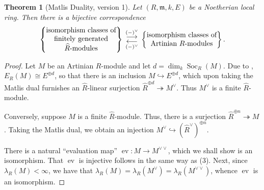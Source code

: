 \documentclass[10pt]{article}
\theoremstyle{thmstyle}
\newtheorem{theorem}{Theorem}[section]
\theoremstyle{defstyle}
\newcommand{\frakm}{\mathfrak{m}} %
\newcommand{\wh}[1]{\widehat{#1}}
\newcommand{\onto}{\twoheadrightarrow}
\newcommand{\into}{\hookrightarrow}
\newcommand{\ev}{\operatorname{ev}}
\newcommand{\Soc}{\operatorname{Soc}}
\begin{document}
\begin{theorem}[Matlis Duality, version 1]
    Let $(R,\frakm,k,E)$ be a Noetherian local ring. Then there is a bijective correspondence 
    \begin{equation*}
        \left\{
        \begin{tabular}{@{} c @{}}
            isomorphism classes of\\
            finitely generated\\ 
            $\wh R$-modules
        \end{tabular}
        \right\}
        \;
        \begin{gathered}
            \overset{(-)^\vee}{\longrightarrow}\\[-2ex]
            \underset{(-)^\vee}{\longleftarrow}
        \end{gathered}
        \;
        \left\{
        \begin{tabular}{@{} c @{}}
            isomorphism classes of\\
            Artinian $R$-modules
        \end{tabular}
        \right\}.
    \end{equation*}
\end{theorem}
\begin{proof} %
    Let $M$ be an Artinian $R$-module and let $d = \dim_k\Soc_R(M)$. Due to , $E_R(M)\cong E^{\oplus d}$, so that there is an inclusion $M\into E^{\oplus d}$, which upon taking the Matlis dual furnishes an $\wh R$-linear surjection $\wh R^{\oplus d}\onto M^{\vee}$. Thus $M^{\vee}$ is a finite $\wh R$-module. 

    Conversely, suppose $M$ is a finite $\wh R$-module. Thus, there is a surjection $\wh R^{\oplus n}\onto M$. Taking the Matlis dual, we obtain an injection $M^\vee\into\left(\wh R^\vee\right)^{\oplus n}$.
    
    There is a natural ``evaluation map'' $\ev: M\to M^{\vee\vee}$, which we shall show is an isomorphism. That $\ev$ is injective follows in the same way as  (3). Next, since $\lambda_R(M) < \infty$, we have that $\lambda_R(M) = \lambda_R(M^\vee) = \lambda_R(M^{\vee\vee})$, whence $\ev$ is an isomorphism.
\end{proof}
\end{document}

